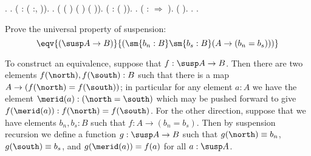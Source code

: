 \begin{coqdoccode}
\coqdocnoindent
{}.\coqdoceol
\coqdocindent{1.00em}
 .\coqdoceol
\coqdocindent{1.00em}
  ( : (\coqdockw{\ensuremath{\forall}} :,   )).\coqdoceol
\coqdocindent{2.00em}
 .  (  ( ) ( ) ( )).\coqdoceol
\coqdocindent{1.00em}
  ( : (    )).\coqdoceol
\coqdocindent{2.00em}
 .  ( : \ensuremath{\Rightarrow}   ).\coqdoceol
\coqdocindent{1.00em}
 (  ).\coqdoceol
\coqdocnoindent
{}.\coqdoceol
\coqdocemptyline
\coqdocemptyline
\coqdocnoindent
{} .\coqdoceol
\coqdocemptyline
\end{coqdoccode}
Prove the universal property of suspension:
\[
  \eqv{ \left(\susp A \to B \right) }{ \left(\sm{b_{n} : B}\sm{b_{s} : B} (A \to (b_{n} = b_{s}))\right) }
\]


 \soln
To construct an equivalence, suppose that $f : \susp A \to B$.  Then there are
two elements $f(\north), f(\south) : B$ such that there is a map $A \to
(f(\north) = f(\south))$; in particular for any element $a : A$ we have the
element $\merid(a) : (\north = \south)$ which may be pushed forward to give
$f(\merid(a)) : f(\north) = f(\south)$.  For the other direction, suppose that
we have elements $b_{n}, b_{s} : B$ such that $f : A \to (b_{n} = b_{s})$.
Then by suspension recursion we define a function $g : \susp A \to B$ such that
$g(\north) \equiv b_{n}$, $g(\south) \equiv b_{s}$, and $g(\merid(a)) = f(a)$
for all $a : \susp A$.



